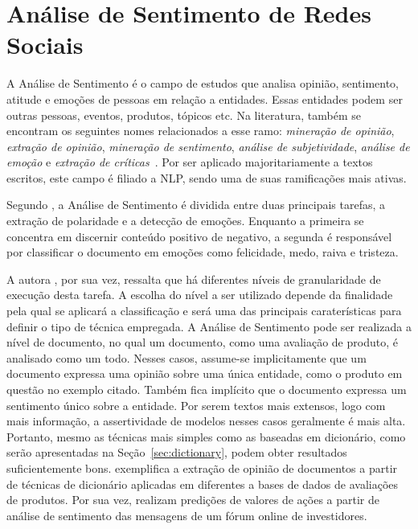 \chapter{Análise de Sentimento de Redes Sociais}
\label{chapter:sentiment}

A Análise de Sentimento é o campo de estudos que analisa opinião, sentimento,
atitude e emoções de pessoas em relação a entidades.
Essas entidades podem ser outras pessoas, eventos, produtos, tópicos etc.
Na literatura, também se encontram os seguintes nomes relacionados a esse ramo:
\textit{mineração de opinião}, \textit{extração de opinião},
\textit{mineração de sentimento}, \textit{análise de subjetividade},
\textit{análise de emoção} e \textit{extração de críticas}~\cite{liu15}.
Por ser aplicado majoritariamente a textos escritos, este campo é filiado
a NLP, sendo uma de suas ramificações mais ativas.

Segundo \citet{cambria16}, a Análise de Sentimento é dividida entre duas
principais tarefas, a extração de polaridade e a detecção de emoções.
Enquanto a primeira se concentra em discernir conteúdo positivo de negativo,
a segunda é responsável por classificar o documento em emoções como felicidade,
medo, raiva e tristeza.

A autora \citet{liu15}, por sua vez, ressalta que há diferentes níveis de
granularidade de execução desta tarefa.
A escolha do nível a ser utilizado depende da finalidade pela qual se aplicará
a classificação e será uma das principais caraterísticas para definir o tipo
de técnica empregada.
A Análise de Sentimento pode ser realizada a nível de documento, no qual um
documento, como uma avaliação de produto, é analisado como um todo.
Nesses casos, assume-se implicitamente que um documento expressa uma opinião
sobre uma única entidade, como o produto em questão no exemplo citado.
Também fica implícito que o documento expressa um sentimento único sobre a
entidade.
Por serem textos mais extensos, logo com mais informação, a assertividade de
modelos nesses casos geralmente é mais alta.
Portanto, mesmo as técnicas mais simples como as baseadas em dicionário, como
serão apresentadas na Seção~\ref{sec:dictionary}, podem obter resultados
suficientemente bons.
\citet{taboada11} exemplifica a extração de opinião de documentos a partir de
técnicas de dicionário aplicadas em diferentes a bases de dados de avaliações de
produtos.
Por sua vez, \citet{das07} realizam predições de valores de ações a partir de
análise de sentimento das mensagens de um fórum online de investidores.

